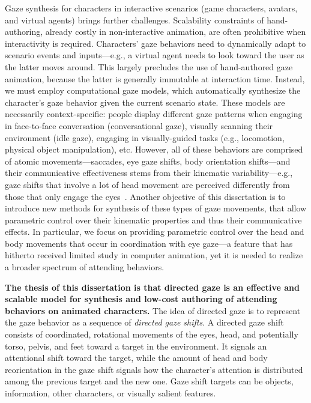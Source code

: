 Gaze synthesis for characters in interactive scenarios (game characters, avatars, and virtual agents) brings further challenges. Scalability constraints of hand-authoring, already costly in non-interactive animation, are often prohibitive when interactivity is required. Characters' gaze behaviors need to dynamically adapt to scenario events and inputs---e.g., a virtual agent needs to look toward the user as the latter moves around. This largely precludes the use of hand-authored gaze animation, because the latter is generally immutable at interaction time. Instead, we must employ computational gaze models, which automatically synthesize the character's gaze behavior given the current scenario state. These models are necessarily context-specific: people display different gaze patterns when engaging in face-to-face conversation (conversational gaze), visually scanning their environment (idle gaze), engaging in visually-guided tasks (e.g., locomotion, physical object manipulation), etc.  However, all of these behaviors are comprised of atomic movements---saccades, eye gaze shifts, body orientation shifts---and their communicative effectiveness stems from their kinematic variability---e.g., gaze shifts that involve a lot of head movement are perceived differently from those that only engage the eyes~\citep{langton2000eyes}. Another objective of this dissertation is to introduce new methods for synthesis of these types of gaze movements, that allow parametric control over their kinematic properties and thus their communicative effects. In particular, we focus on providing parametric control over the head and body movements that occur in coordination with eye gaze---a feature that has hitherto received limited study in computer animation, yet it is needed to realize a broader spectrum of attending behaviors.

\textbf{The thesis of this dissertation is that directed gaze is an effective and scalable model for synthesis and low-cost authoring of attending behaviors on animated characters.} The idea of directed gaze is to represent the gaze behavior as a sequence of \emph{directed gaze shifts}. A directed gaze shift consists of coordinated, rotational movements of the eyes, head, and potentially torso, pelvis, and feet toward a target in the environment. It signals an attentional shift toward the target, while the amount of head and body reorientation in the gaze shift signals how the character's attention is distributed among the previous target and the new one. Gaze shift targets can be objects, information, other characters, or visually salient features.


